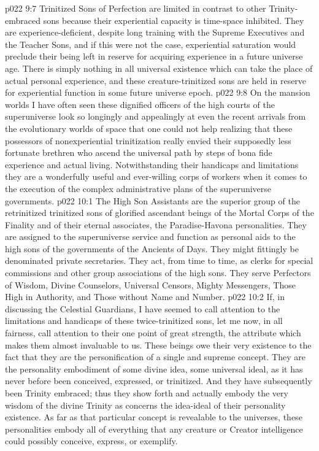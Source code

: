 \vs p022 9:7 Trinitized Sons of Perfection are limited in contrast to other Trinity\hyp{}embraced sons because their experiential capacity is time\hyp{}space inhibited. They are experience\hyp{}deficient, despite long training with the Supreme Executives and the Teacher Sons, and if this were not the case, experiential saturation would preclude their being left in reserve for acquiring experience in a future universe age. There is simply nothing in all universal existence which can take the place of actual personal experience, and these creature\hyp{}trinitized sons are held in reserve for experiential function in some future universe epoch.
\vs p022 9:8 On the mansion worlds I have often seen these dignified officers of the high courts of the superuniverse look so longingly and appealingly at even the recent arrivals from the evolutionary worlds of space that one could not help realizing that these possessors of nonexperiential trinitization really envied their supposedly less fortunate brethren who ascend the universal path by steps of bona fide experience and actual living. Notwithstanding their handicaps and limitations they are a wonderfully useful and ever\hyp{}willing corps of workers when it comes to the execution of the complex administrative plans of the superuniverse governments.
\vs p022 10:1 The High Son Assistants are the superior group of the retrinitized trinitized sons of glorified ascendant beings of the Mortal Corps of the Finality and of their eternal associates, the Paradise\hyp{}Havona personalities. They are assigned to the superuniverse service and function as personal aids to the high sons of the governments of the Ancients of Days. They might fittingly be denominated private secretaries. They act, from time to time, as clerks for special commissions and other group associations of the high sons. They serve Perfectors of Wisdom, Divine Counselors, Universal Censors, Mighty Messengers, Those High in Authority, and Those without Name and Number.
\pc \vs p022 10:2 If, in discussing the Celestial Guardians, I have seemed to call attention to the limitations and handicaps of these twice\hyp{}trinitized sons, let me now, in all fairness, call attention to their one point of great strength, the attribute which makes them almost invaluable to us. These beings owe their very existence to the fact that they are the personification of a single and supreme concept. They are the personality embodiment of some divine idea, some universal ideal, as it has never before been conceived, expressed, or trinitized. And they have subsequently been Trinity embraced; thus they show forth and actually embody the very wisdom of the divine Trinity as concerns the idea\hyp{}ideal of their personality existence. As far as that particular concept is revealable to the universes, these personalities embody all of everything that any creature or Creator intelligence could possibly conceive, express, or exemplify. 
